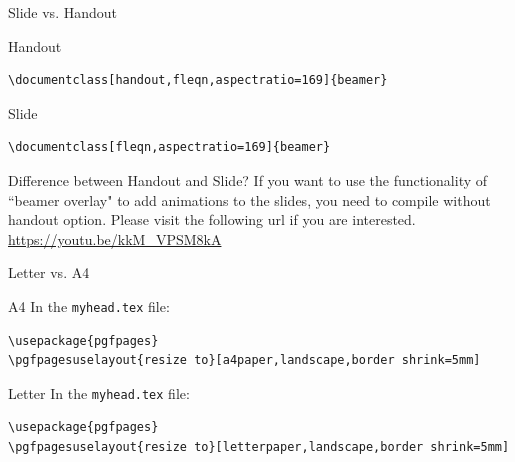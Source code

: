 \documentclass[handout,fleqn,aspectratio=169]{beamer}
\begin{document}
\begin{frame}[fragile]{Slide vs. Handout}

\plitemsep 0.1in

\bci 

\item Handout

\begin{verbatim}
\documentclass[handout,fleqn,aspectratio=169]{beamer}
\end{verbatim}

\item Slide
\begin{verbatim}
\documentclass[fleqn,aspectratio=169]{beamer}
\end{verbatim}

\item Difference between Handout and Slide? If you want to use the functionality of ``beamer overlay" to add animations to the slides, you need to compile without handout option. Please visit the following url if you are interested. 
\medskip
\url{https://youtu.be/kkM_VPSM8kA}




\eci
\end{frame}

\begin{frame}[fragile]{Letter vs. A4}

\plitemsep 0.3in

\bci 

\item A4
In the {\tt myhead.tex} file:

\medskip
{\scriptsize
\begin{verbatim}
\usepackage{pgfpages}
\pgfpagesuselayout{resize to}[a4paper,landscape,border shrink=5mm]
\end{verbatim}
}

\item Letter
In the {\tt myhead.tex} file:

\medskip
{\scriptsize
\begin{verbatim}
\usepackage{pgfpages}
\pgfpagesuselayout{resize to}[letterpaper,landscape,border shrink=5mm]
\end{verbatim}
}

\eci
\end{frame}
\end{document}
